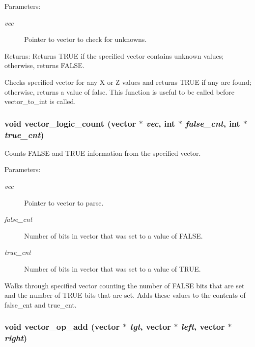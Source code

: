\begin{Desc}
\item[Parameters:]
\begin{description}
\item[{\em vec}]Pointer to vector to check for unknowns.\end{description}
\end{Desc}
\begin{Desc}
\item[Returns:]Returns TRUE if the specified vector contains unknown values; otherwise, returns FALSE.\end{Desc}
Checks specified vector for any X or Z values and returns TRUE if any are found; otherwise, returns a value of false. This function is useful to be called before vector\_\-to\_\-int is called. 
\subsubsection{\setlength{\rightskip}{0pt plus 5cm}void vector\_\-logic\_\-count ({\bf vector} $\ast$ {\em vec}, int $\ast$ {\em false\_\-cnt}, int $\ast$ {\em true\_\-cnt})}\label{vector_8c_a25}


Counts FALSE and TRUE information from the specified vector. 

\begin{Desc}
\item[Parameters:]
\begin{description}
\item[{\em vec}]Pointer to vector to parse. \item[{\em false\_\-cnt}]Number of bits in vector that was set to a value of FALSE. \item[{\em true\_\-cnt}]Number of bits in vector that was set to a value of TRUE.\end{description}
\end{Desc}
Walks through specified vector counting the number of FALSE bits that are set and the number of TRUE bits that are set. Adds these values to the contents of false\_\-cnt and true\_\-cnt. 
\subsubsection{\setlength{\rightskip}{0pt plus 5cm}void vector\_\-op\_\-add ({\bf vector} $\ast$ {\em tgt}, {\bf vector} $\ast$ {\em left}, {\bf vector} $\ast$ {\em right})}\label{vector_8c_a40}


